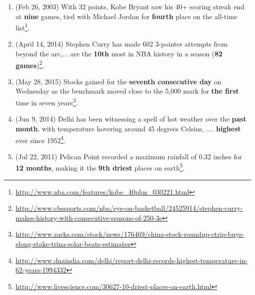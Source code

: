 \begin{enumerate}
\setlength\itemsep{-0.05cm}
\item(Feb 26, 2003) With 32 points, Kobe Bryant saw his 40+ scoring streak end at \textbf{nine} games,  tied with Michael Jordan for \textbf{fourth} place on the all-time list\footnote{\url{http://www.nba.com/features/kobe_40plus_030221.html}}. 

\item(April 14, 2014) Stephen Curry has made 602 3-pointer attempts from beyond the arc,... are the \textbf{10th} most in NBA history in a season (\textbf{82 games})\footnote{\url{http://www.cbssports.com/nba/eye-on-basketball/24525914/stephen-curry-makes-history-with-consecutive-seasons-of-250-3s}}.

\item (May 28, 2015) Stocks gained for the \textbf{seventh consecutive day} on Wednesday as the benchmark moved close to the 5,000 mark for \textbf{the first} time in seven years\footnote{\url{http://www.zacks.com/stock/news/176469/china-stock-roundup-ctrip-buys-elong-stake-trina-solar-beats-estimates}}.

\item (Jun 9,  2014) Delhi has been witnessing a spell of hot weather  over the \textbf{past month}, with temperature hovering around 45 degrees Celsius, .... \textbf{highest} ever since 1952\footnote{\url{http://www.dnaindia.com/delhi/report-delhi-records-highest-temperature-in-62-years-1994332}}.

\item(Jul 22, 2011) Pelican Point recorded a maximum rainfall of 0.32 inches for \textbf{12 months}, making it the  \textbf{9th driest} places on earth\footnote{\url{http://www.livescience.com/30627-10-driest-places-on-earth.html}}.
\end{enumerate}

